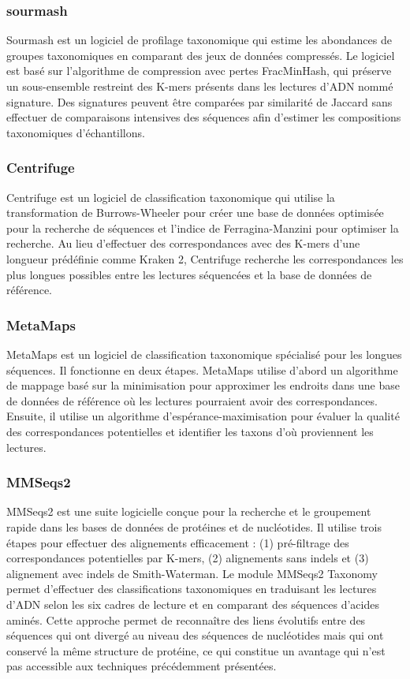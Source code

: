 \subsubsection{sourmash}
Sourmash \cite{sourmash} est un logiciel de profilage taxonomique qui estime les abondances de
groupes taxonomiques en comparant des jeux de données compressés. Le logiciel est basé sur
l'algorithme de compression avec pertes FracMinHash, qui préserve un sous-ensemble restreint des
K-mers présents dans les lectures d'ADN nommé signature. Des signatures peuvent être comparées par
similarité de Jaccard sans effectuer de comparaisons intensives des séquences afin d'estimer les
compositions taxonomiques d'échantillons.

\subsubsection{Centrifuge}
Centrifuge \cite{centrifuge} est un logiciel de classification taxonomique qui utilise la
transformation de Burrows-Wheeler pour créer une base de données optimisée pour la recherche de
séquences et l'indice de Ferragina-Manzini pour optimiser la recherche. Au lieu d'effectuer des
correspondances avec des K-mers d'une longueur prédéfinie comme Kraken 2, Centrifuge recherche les
correspondances les plus longues possibles entre les lectures séquencées et la base de données de
référence.

\subsubsection{MetaMaps}
MetaMaps \cite{metamaps} est un logiciel de classification taxonomique spécialisé pour les longues
séquences. Il fonctionne en deux étapes. MetaMaps utilise d'abord un algorithme de mappage basé sur
la minimisation pour approximer les endroits dans une base de données de référence où les lectures
pourraient avoir des correspondances. Ensuite, il utilise un algorithme d'espérance-maximisation
pour évaluer la qualité des correspondances potentielles et identifier les taxons d'où proviennent
les lectures.

\subsubsection{MMSeqs2}
MMSeqs2 \cite{mmseqs2} est une suite logicielle conçue pour la recherche et le groupement rapide
dans les bases de données de protéines et de nucléotides. Il utilise trois étapes pour effectuer des
alignements efficacement : (1) pré-filtrage des correspondances potentielles par K-mers, (2)
alignements sans indels et (3) alignement avec indels de Smith-Waterman. Le module MMSeqs2 Taxonomy
permet d'effectuer des classifications taxonomiques en traduisant les lectures d'ADN selon les six
cadres de lecture et en comparant des séquences d'acides aminés. Cette approche permet de
reconnaître des liens évolutifs entre des séquences qui ont divergé au niveau des séquences de
nucléotides mais qui ont conservé la même structure de protéine, ce qui constitue un avantage qui
n'est pas accessible aux techniques précédemment présentées.


